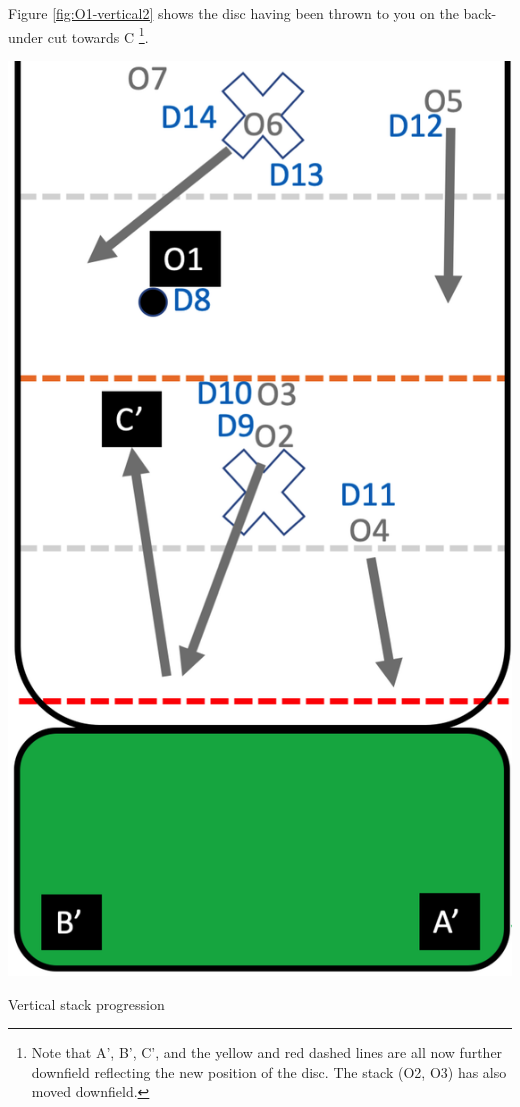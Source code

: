 \documentclass{tufte-handout}
\begin{document}
Figure \ref{fig:O1-vertical2} shows 
the disc having been thrown to you
on the back-under cut towards C \footnote{
Note that A', B', C', and 
the yellow and red dashed lines 
are all now further downfield 
reflecting the new position of the disc.
The stack (O2, O3) 
has also moved downfield.}.

\begin{marginfigure}%
  \includegraphics[width=\linewidth]{O1-vertical2}
  \caption{Vertical stack progression}
  \label{fig:O1-vertical2}
\end{marginfigure}
\end{document}
